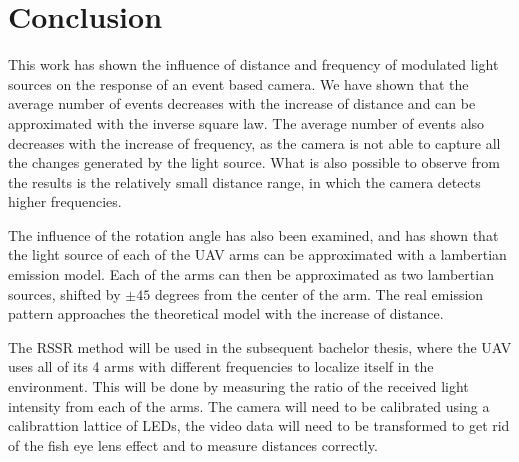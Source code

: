 
\chapter{Conclusion\label{chap:conclusion}}

This work has shown the influence of distance and frequency of modulated light sources on the response of an event based camera.
We have shown that the average number of events decreases with the increase of distance and can be approximated with
the inverse square law. The average number of events also decreases with the increase of frequency, as the camera is not
able to capture all the changes generated by the light source. What is also possible to observe from the results is the relatively
small distance range, in which the camera detects higher frequencies.

The influence of the rotation angle has also been examined, and has shown that the light source of each of the UAV arms can be
approximated with a lambertian emission model. Each of the arms can then be approximated as two lambertian sources, shifted
by $\pm 45$ degrees from the center of the arm. The real emission pattern approaches the theoretical model with the increase
of distance.

The RSSR method will be used in the subsequent bachelor thesis, where the UAV uses all of its 4 arms with different frequencies
to localize itself in the environment. This will be done by measuring the ratio of the received light intensity from each of the
arms. The camera will need to be calibrated using a calibrattion lattice of LEDs, the video data will need to be transformed
to get rid of the fish eye lens effect and to measure distances correctly.